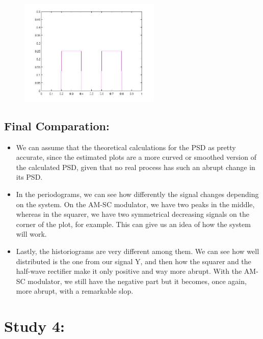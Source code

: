 \documentclass[a4paper,11pt]{article}
\begin{document}
\begin{figure}[!hp]
    \begin{center}
    \includegraphics[width=0.6\textwidth]{images/lab3_redo_28.jpg}
    \end{center}
\end{figure}

\subsection{Final Comparation:}

\begin{itemize}

\item We can assume that the theoretical calculations for the PSD as pretty accurate, since the estimated plots are a more curved or smoothed version of the calculated PSD, given that no real process has such an abrupt change in its PSD. 

\item In the periodograms, we can see how differently the signal changes depending on the system. On the AM-SC modulator, we have two peaks in the middle, whereas in the squarer, we have two symmetrical decreasing signals on the corner of the plot, for example. This can give us an idea of how the system will work.

\item Lastly, the historiograms are very different among them. We can see how well distributed is the one from our signal Y, and then how the squarer and the half-wave rectifier make it only positive and way more abrupt. With the AM-SC modulator, we still have the negative part but it becomes, once again, more abrupt, with a remarkable slop.

\end{itemize}

\newpage

\section{Study 4:}
\end{document}
